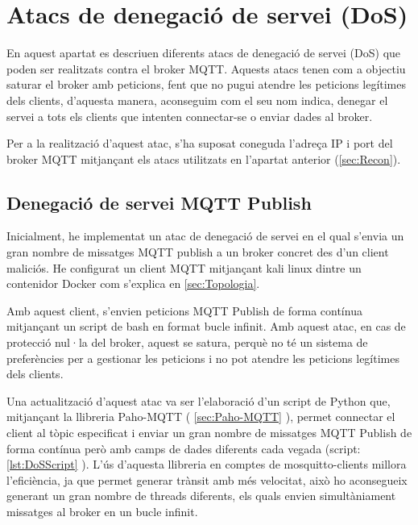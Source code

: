 \section{Atacs de denegació de servei (DoS)}

En aquest apartat es descriuen diferents atacs de denegació de servei (DoS) que poden ser realitzats contra el broker MQTT. Aquests atacs tenen com a objectiu saturar el broker amb peticions, fent que no pugui atendre les peticions legítimes dels clients, d'aquesta manera, aconseguim com el seu nom indica, denegar el servei a tots els clients que intenten connectar-se o enviar dades al broker.

Per a la realització d'aquest atac, s'ha suposat coneguda l'adreça IP i port del broker MQTT mitjançant els atacs utilitzats en l'apartat anterior (\ref{sec:Recon}).

\subsection{Denegació de servei MQTT Publish}

Inicialment, he implementat un atac de denegació de servei en el qual s'envia un gran nombre de missatges MQTT publish a un broker concret des d'un client maliciós. He configurat un client MQTT mitjançant kali linux dintre un contenidor Docker com s'explica en \ref{sec:Topologia}.

Amb aquest client, s'envien peticions MQTT Publish de forma contínua mitjançant un script de bash en format bucle infinit. Amb aquest atac, en cas de protecció nul·la del broker, aquest se satura, perquè no té un sistema de preferències per a gestionar les peticions i no pot atendre les peticions legítimes dels clients.

Una actualització d'aquest atac va ser l'elaboració d'un script de Python que, mitjançant la llibreria Paho-MQTT ( \ref{sec:Paho-MQTT} ), permet connectar el client al tòpic especificat i enviar un gran nombre de missatges MQTT Publish de forma contínua però amb camps de dades diferents cada vegada (script: \ref{lst:DoSScript} ). L'ús d'aquesta llibreria en comptes de mosquitto-clients millora l'eficiència, ja que permet generar trànsit amb més velocitat, això ho aconsegueix generant un gran nombre de threads diferents, els quals envien simultàniament missatges al broker en un bucle infinit.

